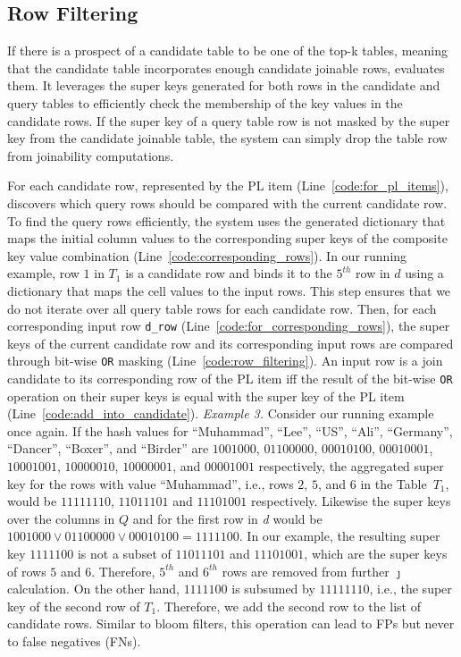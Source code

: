 \subsection{Row Filtering}\label{subsec:rowfiltering}
If there is a prospect of a candidate table to be one of the top-k tables, meaning that the candidate table incorporates enough candidate joinable rows, \system evaluates them. 
It leverages the super keys generated for both rows in the candidate and query tables to efficiently check the membership of the key values in the candidate rows.
If the super key of a query table row is not masked by the super key from the candidate joinable table, the system can simply drop the table row from joinability computations. 

For each candidate row, represented by the PL item (Line~\ref{code:for_pl_items}), \system discovers which query rows should be compared with the current candidate row.
To find the query rows efficiently, the system uses the generated dictionary that maps the initial column values to the corresponding super keys of the composite key value combination (Line~\ref{code:corresponding_rows}). In our running example, row $1$ in $T_1$ is a candidate row and \system binds it to the $5^{th}$ row in $d$ using a dictionary that maps the cell values to the input rows. This step ensures that we do not iterate over all query table rows for each candidate row. Then, for each corresponding input row \texttt{d\_row} (Line~\ref{code:for_corresponding_rows}), the super keys of the current candidate row and its corresponding input rows are compared through bit-wise \texttt{OR} masking (Line~\ref{code:row_filtering}).
An input row is a join candidate to its corresponding row of the PL item iff the result of the bit-wise \texttt{OR} operation on their super keys is equal with the super key of the PL item (Line~\ref{code:add_into_candidate}).
\newline
\noindent\textit{Example 3.} 
Consider our running example once again. If the hash values for ``Muhammad'', ``Lee'', ``US'', ``Ali'', ``Germany'', ``Dancer'', ``Boxer'', and ``Birder'' are $1001000$, $01100000$, $00010100$, $00010001$, 
$10001001$, $10000010$, $10000001$, and $00001001$ respectively, the aggregated super key for the rows with value ``Muhammad'', i.e., rows $2$, $5$, and $6$ in the Table~$T_1$, would be $11111110$, $11011101$ and $11101001$ respectively.
Likewise the super keys over the columns in $Q$ and for the first row in \textit{d} would be $1001000 \vee 01100000 \vee 00010100 = 1111100$.
In our example, the resulting super key $1111100$ is not a subset of $11011101$ and $11101001$, which are the super keys of rows $5$ and $6$. Therefore, $5^{th}$ and $6^{th}$ rows are removed from further $\jmath$ calculation.
On the other hand, $1111100$ is subsumed by $11111110$, i.e., the super key of the second row of $T_1$.
Therefore, we add the second row to the list of candidate rows.
Similar to bloom filters, this operation can lead to FPs but never to false negatives (FNs). 

